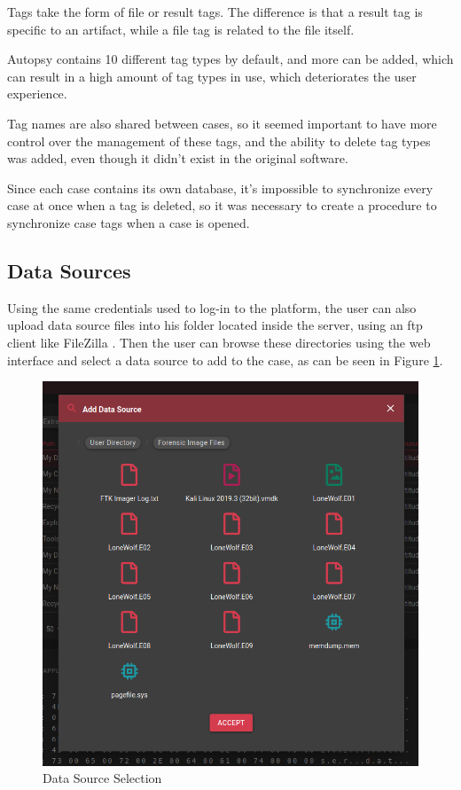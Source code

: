 Tags take the form of file or result tags. The difference is that a result tag is specific to an artifact, while a file tag is related to the file itself.

Autopsy contains 10 different tag types by default, and more can be added, which can result in a high amount of tag types in use, which deteriorates the user experience.

Tag names are also shared between cases, so it seemed important to have more control over the management of these tags, and the ability to delete tag types was added, even though it didn't exist in the original software.

Since each case contains its own database, it's impossible to synchronize every case at once when a tag is deleted, so it was necessary to create a procedure to synchronize case tags when a case is opened.

\subsection{Data Sources}

Using the same credentials used to log-in to the platform, the user can also upload data source files into his folder located inside the server, using an \acrshort{ftp} client like FileZilla \cite{filezilla}.
Then the user can browse these directories using the web interface and select a data source to add to the case, as can be seen in Figure \ref{fig:datasource}.

\begin{figure}[ht]
 \centering
 \includegraphics[width=0.75\linewidth]{imgs/data-sources.png}
 \caption{Data Source Selection}
 \label{fig:datasource}
\end{figure}

